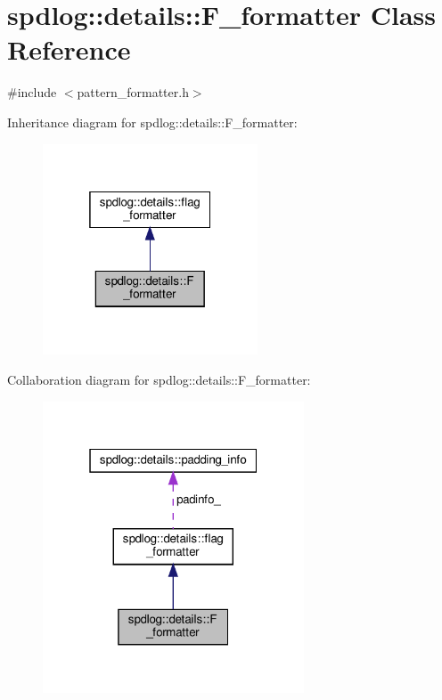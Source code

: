 \hypertarget{classspdlog_1_1details_1_1_f__formatter}{}\section{spdlog\+:\+:details\+:\+:F\+\_\+formatter Class Reference}
\label{classspdlog_1_1details_1_1_f__formatter}


{\ttfamily \#include $<$pattern\+\_\+formatter.\+h$>$}



Inheritance diagram for spdlog\+:\+:details\+:\+:F\+\_\+formatter\+:
\nopagebreak
\begin{figure}[H]
\begin{center}
\leavevmode
\includegraphics[width=181pt]{classspdlog_1_1details_1_1_f__formatter__inherit__graph}
\end{center}
\end{figure}


Collaboration diagram for spdlog\+:\+:details\+:\+:F\+\_\+formatter\+:
\nopagebreak
\begin{figure}[H]
\begin{center}
\leavevmode
\includegraphics[width=220pt]{classspdlog_1_1details_1_1_f__formatter__coll__graph}
\end{center}
\end{figure}
